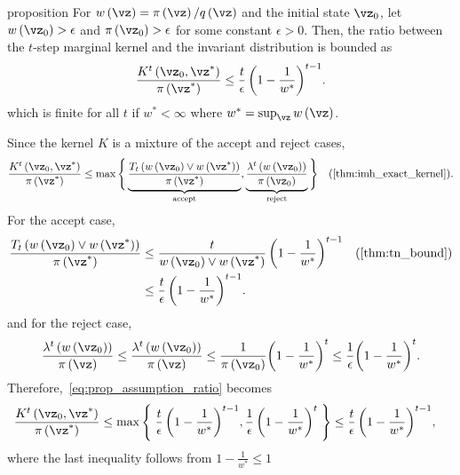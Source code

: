 
\begin{theoremEnd}{proposition}\label{thm:imh_tail}
  For \(w\left(\vz\right) = \pi\left(\vz\right)/q\left(\vz\right)\) and the initial state \(\vz_0\), let \(w\left(\vz_0\right) > \epsilon\) and \(\pi\left(\vz_0\right) > \epsilon\) for some constant \(\epsilon > 0\).
  Then, the ratio between the \(t\)-step marginal kernel and the invariant distribution is bounded as
  {\small
  \[
  \frac{K^t\left(\vz_0, \vz^*\right)}{\pi\left(\vz^*\right)} \leq
  \frac{t}{\epsilon} \, {\left(1 - \frac{1}{w^*}\right)}^{t-1}.
  \]
  }
  which is finite for all \(t\) if \(w^* < \infty\) where \(w^* = \sup_{\vz} w\left(\vz\right)\).
\end{theoremEnd}
\begin{proofEnd}
  Since the kernel \(K\) is a mixture of the accept and reject cases, 
  \begin{align}
    \frac{K^t\left(\vz_0, \vz^*\right)}{\pi\left(\vz^*\right)}
    &\leq
    \max\Bigg\{
    \underbrace{
      \frac{T_t\left(w\left(\vz_0\right) \vee w\left(\vz^*\right)\right)}{\pi\left(\vz^*\right)}
    }_{\text{accept}},
    \underbrace{
    \frac{\lambda^t\left(w\left(\vz_0\right)\right)}{\pi\left(\vz_0\right)}
    }_{\text{reject}}
    \Bigg\}
    &\text{(\cref{thm:imh_exact_kernel})}.\label{eq:prop_assumption_ratio}
  \end{align}
  For the accept case,
  \begin{align}
    \frac{T_t\left(w\left(\vz_0\right) \vee w\left(\vz^*\right)\right)}{\pi\left(\vz^*\right)}
    &\leq
    \frac{t}{w\left(\vz_0\right) \vee w\left(\vz^*\right)} \, {\left(1 - \frac{1}{w^*}\right)}^{t-1}
    &\text{(\cref{thm:tn_bound})}
    \\
    &\leq
    \frac{t}{\epsilon} \, {\left(1 - \frac{1}{w^*}\right)}^{t-1} .
  \end{align}
  and for the reject case,
  \begin{align}
    \frac{\lambda^t\left(w\left(\vz_0\right)\right)}{\pi\left(\vz\right)}
    \leq
    \frac{\lambda^t\left(w\left(\vz_0\right)\right)}{\pi\left(\vz\right)}
    \leq
    \frac{1}{\pi\left(\vz_0\right)} {\left(1 - \frac{1}{w^*}\right)}^{t}
    \leq
    \frac{1}{\epsilon}
    {\left(1 - \frac{1}{w^*}\right)}^{t}.
  \end{align}
  Therefore,~\cref{eq:prop_assumption_ratio} becomes
  \begin{align}
    \frac{K^t\left(\vz_0, \vz^*\right)}{\pi\left(\vz^*\right)}
    \leq
    \max\left\{\;
    \frac{t}{\epsilon} \, {\left(1 - \frac{1}{w^*}\right)}^{t-1},
    \frac{1}{\epsilon} \, {\left(1-\frac{1}{w^*}\right)}^t
    \;\right\}
    &\leq
    \frac{t}{\epsilon} \, {\left(1 - \frac{1}{w^*}\right)}^{t-1},
  \end{align}
  where the last inequality follows from \(1 - \frac{1}{w^*} \leq 1\)
\end{proofEnd}

